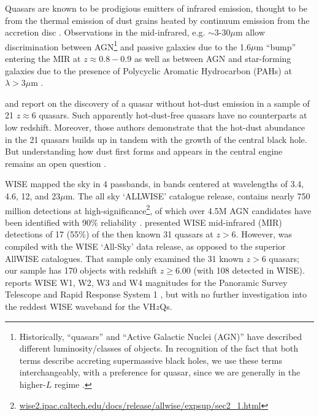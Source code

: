 \documentclass[usenatbib]{mnras}
\begin{document}
Quasars are known to be prodigious emitters of infrared emission,
thought to be from the thermal emission of dust grains heated by
continuum emission from the accretion disc
\citep[e.g.,][]{Richards2006b, Leipski2014, Hill2014,
Hickox2017}. Observations in the mid-infrared, e.g. $\sim$3-30$\mu$m
allow discrimination between AGN\footnote{Historically, ``quasars''
and ``Active Galactic Nuclei (AGN)'' have described different
luminosity/classes of objects. In recognition of the fact that both
terms describe accreting supermassive black holes, we use these terms
interchangeably, with a preference for quasar, since we are generally
in the higher-$L$ regime \citep[e.g.][]{Haardt2016book}.}  and passive
galaxies due to the 1.6$\mu$m ``bump'' entering the MIR at
$z\approx0.8-0.9$ \citep[e.g., ][]{Wright1994, Sawicki2002, Lacy2004,
Stern2005, Richards2006b, Timlin2016} as well as between AGN and
star-forming galaxies due to the presence of Polycyclic Aromatic
Hydrocarbon (PAHs) at $\lambda >3\mu$m \citep[e.g., ][]{Yan2007,
Tielens2008}.

\citet{Jiang2006dust} and \citet{Jiang2010} report on the discovery of
a quasar without hot-dust emission in a sample of 21 $z\approx6$
quasars. Such apparently hot-dust-free quasars have no counterparts at
low redshift. Moreover, those authors demonstrate that the hot-dust
abundance in the 21 quasars builds up in tandem with the growth of the
central black hole. But understanding how dust first forms and appears
in the central engine remains an open question \citep{WangR2008,
WangR2011}.

WISE mapped the sky in 4 passbands, in bands centered at wavelengths
of 3.4, 4.6, 12, and 23$\mu$m. The all sky `ALLWISE' catalogue
release, contains nearly 750 million detections at
high-significance\footnote{\href{wise2.ipac.caltech.edu/docs/release/allwise/expsup/sec2\_1.html}{wise2.ipac.caltech.edu/docs/release/allwise/expsup/sec2\_1.html}},
of which over 4.5M AGN candidates have been identified with 90\%
reliability \citep{Assef2018}.  \citet{Blain2013} presented WISE
mid-infrared (MIR) detections of 17 (55\%) of the then known 31
quasars at $z > 6$. However, \citet{Blain2013} was compiled with the
WISE `All-Sky' data release, as opposed to the superior AllWISE
catalogues. That sample only examined the 31 known $z>6$ quasars; our
sample has 170 objects with redshift $z \geq 6.00$ (with 108 detected
in WISE). \citet{Banados2016} reports WISE W1, W2, W3 and W4
magnitudes for the Panoramic Survey Telescope and Rapid Response
System 1 \citep[Pan-STARRS1, PS1;][]{Kaiser2002, Kaiser2010}, but with
no further investigation into the reddest WISE waveband for the
VH$z$Qs.
\end{document}
